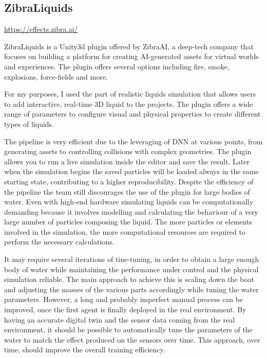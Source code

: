 
\subsection{ZibraLiquids}

{\url{https://effects.zibra.ai/}}

\begin{textblock}
ZibraLiquids is a Unity3d plugin offered by ZibraAI, a deep-tech company that focuses on building a platform for creating AI-generated assets for virtual worlds and experiences. The plugin offers several options including fire, smoke, explosions, force-fields and more.

For my purposes, I used the part of realistic liquids simulation that allows users to add interactive, real-time 3D liquid to the projects. The plugin offers a wide range of parameters to configure visual and physical properties to create different types of liquids.

The pipeline is very efficient due to the leveraging of DNN at various points, from generating assets to controlling collisions with complex geometries.
The plugin allows you to run a live simulation inside the editor and save the result. Later when the simulation begins the saved particles will be loaded always in the same starting state, contributing to a higher reproducibility.
Despite the efficiency of the pipeline the team still discourages the use of the plugin for large bodies of water. Even with high-end hardware simulating liquids can be computationally demanding because it involves modelling and calculating the behaviour of a very large number of particles composing the liquid. The more particles or elements involved in the simulation, the more computational resources are required to perform the necessary calculations.

It may require several iterations of tine-tuning, in order to obtain a large enough body of water while maintaining the performance under control and the physical simulation reliable. The main approach to achieve this is scaling down the boat and adjusting the masses of the various parts accordingly while tuning the water parameters. However, a long and probably imperfect manual process can be improved, once the first agent is finally deployed in the real environment. By having an accurate digital twin and the sensor data coming from the real environment, it should be possible to automatically tune the parameters of the water to match the effect produced on the sensors over time. This approach, over time, should improve the overall training efficiency. 


\end{textblock}
